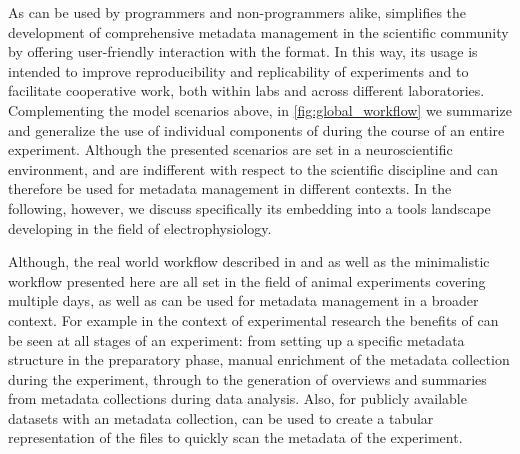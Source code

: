 As  can be used by programmers and non-programmers alike,  simplifies the development of comprehensive metadata management in the scientific community by offering user-friendly interaction with the  format. In this way, its usage is intended to improve reproducibility and replicability of experiments and to facilitate cooperative work, both within labs and across different laboratories. Complementing the model scenarios above, in \cref{fig:global_workflow} we summarize and generalize the use of individual components of  during the course of an entire experiment. Although the presented scenarios are set in a neuroscientific environment,  and  are indifferent with respect to the scientific discipline and can therefore be used for metadata management in different contexts. In the following, however, we discuss specifically its embedding into a tools landscape developing in the field of electrophysiology.

Although, the real world workflow described in \cite{Brochier_2018} and \cite{Zehl_2016} as well as the minimalistic workflow presented here are all set in the field of animal experiments covering multiple days,  as well as  can be used for metadata management in a broader context. For example in the context of experimental research the benefits of  can be seen at all stages of an experiment: from setting up a specific metadata structure in the preparatory phase, manual enrichment of the metadata collection during the experiment, through to the generation of overviews and summaries from metadata collections during data analysis. Also, for publicly available datasets with an  metadata collection,  can be used to create a tabular representation of the  files to quickly scan the metadata of the experiment.

